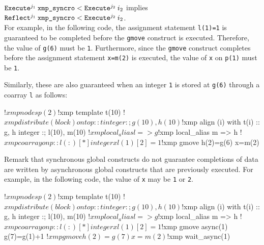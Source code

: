 \noindent
$\texttt{Execute}^{j_1} \: {\texttt{xmp\_syncro}} < \texttt{Execute}^{j_2} \: {i_2}$ implies $\texttt{Reflect}^{j_1} \: {\texttt{xmp\_syncro}} < \texttt{Execute}^{j_2} \: {i_2}$.\\

For example, in the following code, the assignment statement \texttt{l(1)=1} is
guaranteed to be completed before the \texttt{gmove} construct is
executed.  Therefore, the value of \texttt{g(6)} must be \texttt{1}.
Furthermore, since the \texttt{gmove} construct completes before the
assignment statement \texttt{x=m(2)} is executed, the value of \texttt{x} on
\texttt{p(1)} must be \texttt{1}.
\begin{center}
\end{center}

Similarly, these are also guaranteed when an integer \texttt{1} is
stored at \texttt{g(6)} through a coarray \texttt{l} as follows:
\begin{center}
\begin{XFexample}
!$xmp nodes p(2)
!$xmp template t(10)
!$xmp distribute (block) onto p :: t
      integer :; g(10), h(10)
!$xmp align (i) with t(i) :: g, h
      integer :; l(10), m(10)
!$xmp local_alias l => g
!$xmp local_alias m => h
!$xmp coarray on p :: l(:)[*]
      integer x

      l(1)[2]=1
!$xmp gmove
      h(2)=g(6)
      x=m(2)
\end{XFexample}
\end{center}

Remark that synchronous global constructs do not guarantee completions
of data are written by asynchronous global constructs that are
previously executed.  For example, in the following code, the value of
\texttt{x} may be \texttt{1} or \texttt{2}.

\begin{center}
\begin{XFexample}
!$xmp nodes p(2)
!$xmp template t(10)
!$xmp distribute (block) onto p :: t
      integer :; g(10), h(10)
!$xmp align (i) with t(i) :: g, h
      integer :; l(10), m(10)
!$xmp local_alias l => g
!$xmp local_alias m => h
!$xmp coarray on p :: l(:)[*]
      integer x

      l(1)[2]=1
!$xmp gmove async(1)
      g(7)=g(1)+1
!$xmp gmove
      h(2)=g(7)
      x=m(2)
!$xmp wait_async(1)
\end{XFexample}
\end{center}

